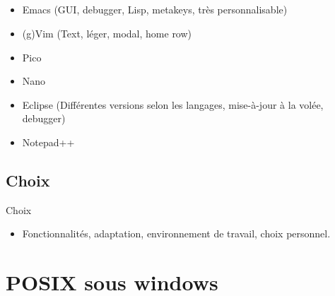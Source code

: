 \subsection{\subsectitle}
\begin{frame}{\sectitle}
    \begin{block}{\subsectitle}
        \begin{itemize}
            \item Emacs (GUI, debugger, Lisp, metakeys, très personnalisable)
            \item (g)Vim (Text, léger, modal, home row)
            \item Pico
            \item Nano
            \item Eclipse (Différentes versions selon les langages, mise-à-jour
                à la volée, debugger)
            \item Notepad++
        \end{itemize}
    \end{block}

\def\subsectitle{Choix}
\subsection{\subsectitle}
    \begin{block}{\subsectitle}
        \begin{itemize}
            \item Fonctionnalités, adaptation, environnement de travail, choix
                personnel.
        \end{itemize}
    \end{block}
\end{frame}


\def\sectitle{POSIX sous windows}
\section{\sectitle}
\def\subsectitle{Unix avec Cygwin}
